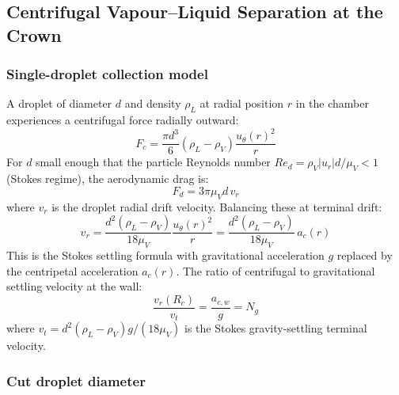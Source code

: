 \documentclass[11pt,letterpaper]{article}
\newcommand{\rhoL}{\rho_L}
\newcommand{\rhoV}{\rho_V}
\newcommand{\utheta}{u_{\theta}}
\newcommand{\Rey}{\mathit{Re}}
\begin{document}
\subsection{Centrifugal Vapour--Liquid Separation at the Crown}
\label{sec:separation}

\subsubsection{Single-droplet collection model}

A droplet of diameter $d$ and density $\rhoL$ at radial position $r$ in
the chamber experiences a centrifugal force radially outward:
\begin{equation}
  F_c = \frac{\pi d^3}{6}(\rhoL - \rhoV)\frac{\utheta(r)^2}{r}
  \label{eq:fc}
\end{equation}
For $d$ small enough that the particle Reynolds number $\Rey_d =
\rhoV |u_r| d/\mu_V < 1$ (Stokes regime), the aerodynamic drag is:
\begin{equation}
  F_d = 3\pi \mu_V d\,v_r
  \label{eq:fd}
\end{equation}
where $v_r$ is the droplet radial drift velocity.  Balancing these at
terminal drift:
\begin{equation}
  v_r = \frac{d^2(\rhoL - \rhoV)}{18\mu_V}\frac{\utheta(r)^2}{r}
      = \frac{d^2(\rhoL - \rhoV)}{18\mu_V}\,a_c(r)
  \label{eq:vr}
\end{equation}
This is the Stokes settling formula with gravitational acceleration $g$
replaced by the centripetal acceleration $a_c(r)$.  The ratio of
centrifugal to gravitational settling velocity at the wall:
\begin{equation}
  \frac{v_r(R_c)}{v_t} = \frac{a_{c,w}}{g} = N_g
  \label{eq:ng_ratio}
\end{equation}
where $v_t = d^2(\rhoL-\rhoV)g/(18\mu_V)$ is the Stokes gravity-settling
terminal velocity.

\subsubsection{Cut droplet diameter}
\end{document}
